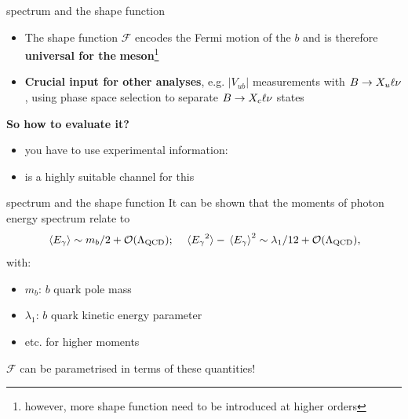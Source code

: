 \documentclass[xcolor=dvipsnames]{beamer}
\begin{document}
   \begin{frame}{\BtoXsgamma spectrum and the shape function}
      \scriptsize
      \begin{itemize}
         \item The shape function $\mathcal{F}$ encodes the Fermi motion of the $b$ and is therefore \textbf{universal for the}  \textbf{meson}\footnote[1]{\tiny however, more shape function need to be introduced at higher orders}
         \item \textbf{Crucial input for other analyses}, e.g. $|V_{ub}|$ measurements with $B\rightarrow X_u\ell\nu$, using phase space selection to separate $B\rightarrow X_c\ell\nu$ states
      \end{itemize}

      \textbf{So how to evaluate it?}
      \begin{itemize}
         \item[\ra] you have to use experimental information: 
         \item[\ra] \BtoXsgamma is a highly suitable channel for this
      \end{itemize}

   \end{frame}

   \begin{frame}{\BtoXsgamma spectrum and the shape function}
      \scriptsize
      It can be shown that the moments of photon energy spectrum relate to
      \begin{equation}\nonumber
         \expval**{{E_{\gamma}}} \sim m_b/2+{\cal O}(\Lambda_{\mathrm{QCD}}); \quad \expval**{{E_{\gamma}}^2}-\expval**{{E_{\gamma}}}^2 \sim \lambda_1/12+{\cal O}(\Lambda_{\mathrm{QCD}}),
     \end{equation}
     with:
     \begin{itemize}
      \item [] $m_b$: $b$ quark pole mass
      \item [] $\lambda_1$: $b$ quark kinetic energy parameter
      \item [] etc. for higher moments
     \end{itemize}
   $\mathcal{F}$ can be parametrised in terms of these quantities!
   \end{frame}
\end{document}
